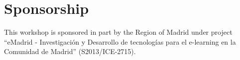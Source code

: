 \documentclass[ifip]{svmult}
\begin{document}
\section*{Sponsorship}
This workshop is sponsored in part by the Region of Madrid under project ``eMadrid - Investigación y Desarrollo de tecnologías para el e-learning en la Comunidad de Madrid'' (S2013/ICE-2715).

%
%
% 
% 
%
%


\printindex
\end{document}

